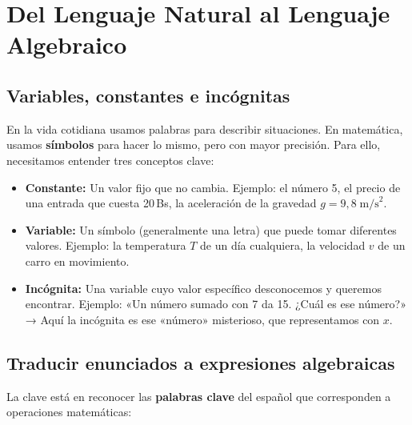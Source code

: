 \documentclass[12pt, letterpaper]{article}
\begin{document}
\newpage

\section{Del Lenguaje Natural al Lenguaje Algebraico}

\subsection{Variables, constantes e incógnitas}

En la vida cotidiana usamos palabras para describir situaciones. En matemática, usamos \textbf{símbolos} para hacer lo mismo, pero con mayor precisión. Para ello, necesitamos entender tres conceptos clave:

\begin{cuadroteoria}
  \begin{itemize}[leftmargin=*]
    \item \textbf{Constante:} Un valor fijo que no cambia. Ejemplo: el número 5, el precio de una entrada que cuesta 20\,Bs, la aceleración de la gravedad $g = 9{,}8\;\text{m/s}^2$.
    \item \textbf{Variable:} Un símbolo (generalmente una letra) que puede tomar diferentes valores. Ejemplo: la temperatura $T$ de un día cualquiera, la velocidad $v$ de un carro en movimiento.
    \item \textbf{Incógnita:} Una variable cuyo valor específico desconocemos y queremos encontrar. Ejemplo: «Un número sumado con 7 da 15. ¿Cuál es ese número?» → Aquí la incógnita es ese «número» misterioso, que representamos con $x$.
  \end{itemize}
\end{cuadroteoria}

\subsection{Traducir enunciados a expresiones algebraicas}

La clave está en reconocer las \textbf{palabras clave} del español que corresponden a operaciones matemáticas:
\end{document}
